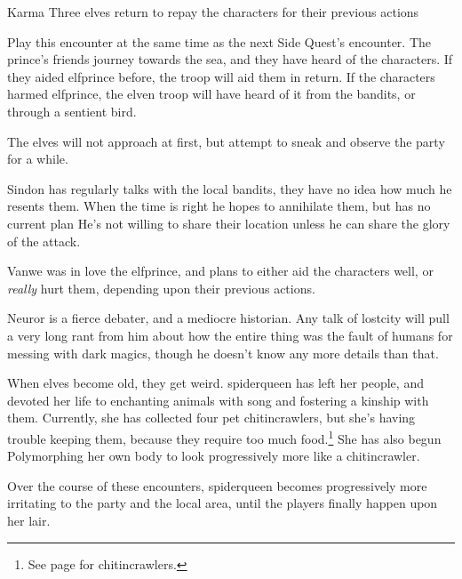 \begin{multicols}{2}
{Karma}%
{Three elves return to repay the characters for their previous actions}%

Play this encounter at the same time as the next Side Quest's encounter.
The prince's friends journey towards the sea, and they have heard of the characters.
If they aided \gls{elfprince} before, the troop will aid them in return.
If the characters harmed \gls{elfprince}, the elven troop will have heard of it from the bandits, or through a sentient bird.

The elves will not approach at first, but attempt to sneak and observe the party for a while.


Sindon has regularly talks with the local bandits, they have no idea how much he resents them.
When the time is right he hopes to annihilate them, but has no current plan
He's not willing to share their location unless he can share the glory of the attack.


Vanwe was in love the \gls{elfprince}, and plans to either aid the characters well, or \emph{really} hurt them, depending upon their previous actions.

Neuror is a fierce debater, and a mediocre historian.  Any talk of \gls{lostcity} will pull a very long rant from him about how the entire thing was the fault of humans for messing with dark magics, though he doesn't know any more details than that.

\label{neuror}

\stopcontents[sq]

\resumecontents[Villages]
\stopcontents[Villages]

\startcontents[sq]

\sqminitoc

\noindent
When elves become old, they get weird.
\Gls{spiderqueen} has left her people, and devoted her life to enchanting animals with song and fostering a kinship with them.
Currently, she has collected four pet chitincrawlers, but she's having trouble keeping them, because they require too much food.\footnote{See page \pageref{chitincrawler} for chitincrawlers.}
She has also begun Polymorphing her own body to look progressively more like a chitincrawler.

Over the course of these encounters, \gls{spiderqueen} becomes progressively more irritating to the party and the local area, until the players finally happen upon her lair.


\end{multicols}
